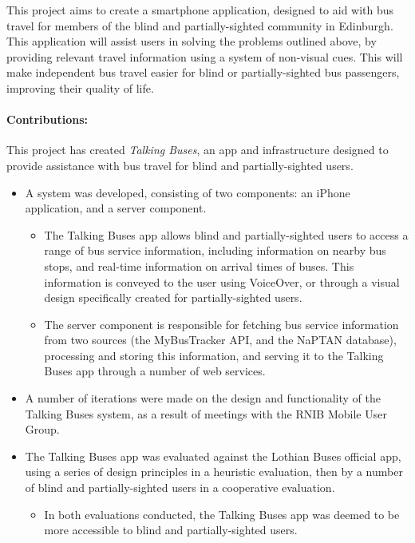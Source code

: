 \documentclass[10pt,twocolumn]{article}
\begin{document}
This project aims to create a smartphone application, designed to aid with bus travel for members of the blind and partially-sighted community in Edinburgh. This application will assist users in solving the problems outlined above, by providing relevant travel information using a system of non-visual cues. This will make independent bus travel easier for blind or partially-sighted bus passengers, improving their quality of life.


\paragraph{Contributions:}
This project has created \emph{Talking Buses}, an app and infrastructure designed to provide assistance with bus travel for blind and partially-sighted users.
\begin{itemize}
\item A system was developed, consisting of two components: an iPhone application, and a server component.
\begin{itemize}
\item  The Talking Buses app allows blind and partially-sighted users to access a range of bus service information, including information on nearby bus stops, and real-time information on arrival times of buses. This information is conveyed to the user using VoiceOver, or through a visual design specifically created for partially-sighted users.
\item The server component is responsible for fetching bus service information from two sources (the MyBusTracker API, and the NaPTAN database), processing and storing this information, and serving it to the Talking Buses app through a number of web services.
\end{itemize}
\item A number of iterations were made on the design and functionality of the Talking Buses system, as a result of meetings with the RNIB Mobile User Group.
\item The Talking Buses app was evaluated against the Lothian Buses official app, using a series of design principles in a heuristic evaluation, then by a number of blind and partially-sighted users in a cooperative evaluation. 
\begin{itemize}
\item In both evaluations conducted, the Talking Buses app was deemed to be more accessible to blind and partially-sighted users.
\end{itemize}
\end{itemize}
\end{document}
